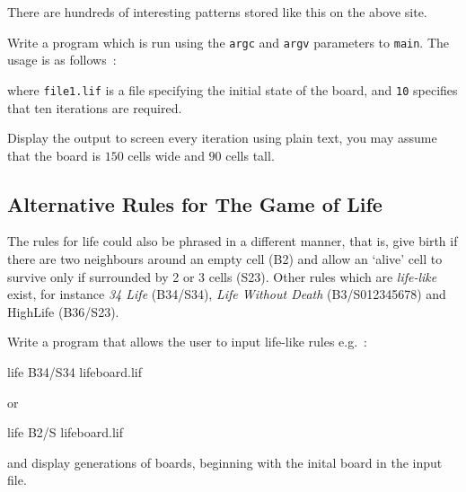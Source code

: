 There are hundreds of interesting patterns stored like this
on the above site.

\begin{exercise}
\label{ex:life106}
Write a program which is run using the \verb^argc^ and
\verb^argv^ parameters to \verb^main^. The usage is
as follows~:
\begin{terminaloutput}
\end{terminaloutput}
where \verb^file1.lif^ is a file specifying the initial
state of the board, and \verb^10^ specifies that ten
iterations are required.

Display the output to screen every iteration using plain text,
you may assume that the board is $150$ cells wide and $90$ cells tall.
\end{exercise}

\subsection*{Alternative Rules for The Game of Life}

The rules for life could also be phrased in a different manner, that
is, give birth if there are two neighbours around an empty cell (B2)
and allow an `alive' cell to survive only if surrounded by 2 or 3 cells (S23).
Other rules which are {\it life-like} exist,
for instance {\it 34 Life} (B34/S34), {\it Life Without Death} (B3/S012345678)
and {HighLife} (B36/S23).

\begin{exercise}
Write a program that allows the user to input life-like rules e.g.~:
\begin{terminaloutput}
life B34/S34 lifeboard.lif
\end{terminaloutput}
or
\begin{terminaloutput}
life B2/S lifeboard.lif
\end{terminaloutput}
and display generations of boards, beginning with the inital board in
the input file.
\end{exercise}
